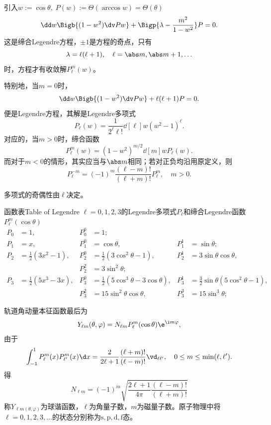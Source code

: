 引入$w:=\cos\theta,\;P(w):=\varTheta(\arccos w)=\varTheta(\theta)$
\begin{equation}
	\dd w\Bigb{(1-w^2)\dv Pw}+\Bigp{\lambda-\frac{m^2}{1-w^2}}P=0.
\end{equation}
这是缔合Legendre方程，$\pm 1$是方程的奇点，只有
\[
	\lambda=\ell(\ell+1),\quad\ell=\abs m,\abs m+1,\ldots
\]
时，方程才有收敛解$P_\ell^m(w)$。

特别地，当$m=0$时，
\[
	\dd w\Bigb{(1-w^2)\dv Pw}+\ell(\ell+1)P=0.
\]
便是Legendre方程，其解是Legendre多项式
\[
	P_\ell(w)=\frac1{2^\ell\ell!}\dd[\ell]w(w^2-1)^\ell.
\]
对应的，当$m>0$时，缔合\Legd 函数
\[
	P_\ell^m(w)=(1-w^2)^{m/2}\dd[m]wP_\ell(w).
\]
而对于$m<0$的情形，其实应当与$\abs m$相同；若对正负均沿用原定义，则
\[
	P_\ell^{-m}=(-1)^m\frac{(\ell-m)!}{(\ell+m)!}P_\ell^m,\quad m>0.
\]

\Legd 多项式的奇偶性由$\ell$决定。
\begin{example}{\Legd 函数表}{Table of Legendre}
	$\ell=0,1,2,3$的Legendre多项式$P_\ell$和缔合Legendre函数$P_\ell^m(\cos\theta)$%
	\begin{align*}
		P_0 & =1, & P_0^0 & =1;\\
		P_1 & =x, & P_1^0 & =\cos\theta, & P_1^1 & =\sin\theta;\\
		P_2 & =\frac12(3x^2-1), & P_2^0 & =\frac12(3\cos^2\theta-1), & P_2^1 & =3\sin\theta\cos\theta,\\
			&& P_2^2 &=3\sin^2\theta;\\
		P_3 & =\frac12(5x^3-3x), & P_3^0 & =\frac12(5\cos^3\theta-3\cos\theta), & P_3^1 & =\frac32\sin\theta(5\cos^2\theta-1),\\
			&& P_3^2 & =15\sin^2\theta\cos\theta, & P_3^3 & =15\sin^3\theta;
	\end{align*}
\end{example}
轨道角动量本征函数最后为
\[
	Y_{\ell m}(\theta,\varphi)=N_{\ell m}P_\ell^m(\cos\theta)\e^{\i m\varphi},
\]
由于
\[
	\int_{-1}^1P_\ell^m(x)P_{\ell'}^m(x)\d x=\frac2{2\ell+1}\frac{(\ell+m)!}{(\ell-m)!}\vd_{\ell\ell'},\quad 0\leq m\leq\min(\ell,\ell').
\]
得
\[
N_{\ell m}=(-1)^m\sqrt{\frac{2\ell+1}{4\pi}\frac{(\ell-m)!}{(\ell+m)!}}
\]
称$Y_{\ell m(\theta,\varphi)}$为球谐函数，$\ell$为角量子数，$m$为磁量子数。原子物理中将$\ell=0,1,2,3,\ldots$的状态分别称为$\mathrm{s,p,d,f}$态。

